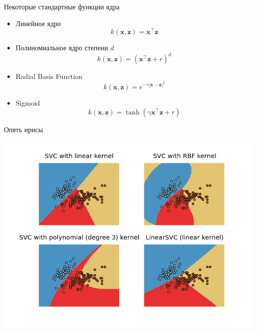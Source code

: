 \documentclass[10pt,a4paper]{beamer}
\begin{document}

\begin{frame}{Некоторые стандартные функции ядра}

\begin{itemize}
\item Линейное ядро
\[
k(\mathbf{x}, \mathbf{z}) = \mathbf{x}^\top\mathbf{z}
\]
\item Полиномиальное ядро степени $d$
\[
k(\mathbf{x}, \mathbf{z}) = (\mathbf{x}^\top\mathbf{z} + r)^d
\]
\item Radial Basis Function
\[
k(\mathbf{x}, \mathbf{z}) = e^{-\gamma |\mathbf x - \mathbf z|^2}
\]
\item Sigmoid
\[
k(\mathbf{x}, \mathbf{z}) = \tanh (\gamma \mathbf{x}^\top\mathbf{z} + r)
\]

\end{itemize}

\end{frame}


\begin{frame}{Опять ирисы}

\begin{center}
\includegraphics[scale=0.5]{images/iris.png}
\end{center}

\end{frame}

\end{document}
